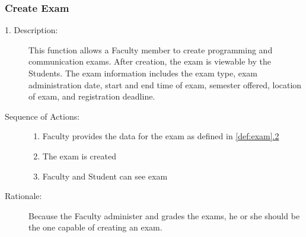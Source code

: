    \subsubsection{\large Create Exam} 
   \begin{boxed} %
      \begin{description}
         \item[1. Description:\label{desc:create_exam}]
      This function allows a Faculty member to create programming and
      communication exams. After creation, the exam is viewable by the Students.
      The exam information includes the exam type, exam administration date,
      start and end time of exam, semester offered, location of exam, and
      registration deadline.
      
         \item[Sequence of Actions:]\hspace{10cm}
      \begin{enumerate}
         \item Faculty provides the data for the exam as defined in
            \autoref{def:exam}\hyperref[def:exam]{.2}
         \item The exam is created
         \item Faculty and Student can see exam
      \end{enumerate}

         \item[Rationale:]
      Because the Faculty administer and grades the exams, he or she should
      be the one capable of creating an exam.
      \end{description}
   \end{boxed} %

